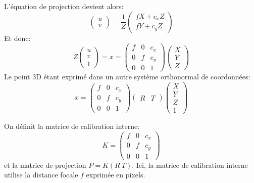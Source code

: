 \documentclass[info, math]{mpb-cours}
\begin{document}
L'équation de projection devient alors:
\begin{equation*}
	\begin{pmatrix}
		u \\ v
	\end{pmatrix} = \frac{1}{Z}
	\begin{pmatrix}
		fX + c_{x}Z \\ fY + c_{y}Z
	\end{pmatrix}
\end{equation*}
Et donc:
\begin{equation*}
	Z \begin{pmatrix}
		u \\ v \\ 1
	\end{pmatrix} = x =
	\begin{pmatrix}
		f & 0 & c_{x} \\ 0 & f & c_{y}\\ 0 & 0 & 1
	\end{pmatrix}
	\begin{pmatrix}
		X \\ Y \\ Z
	\end{pmatrix}
\end{equation*}
Le point 3D étant exprimé dans un autre système orthonormal de coordonnées:
\begin{equation*}
	x =	\begin{pmatrix}
		f & 0 & c_{x} \\ 0 & f & c_{y}\\ 0 & 0 & 1
	\end{pmatrix}
	\begin{pmatrix}
		R & T
	\end{pmatrix}
	\begin{pmatrix}
		X \\ Y \\ Z\\ 1
	\end{pmatrix}
\end{equation*}

On définit la matrice de calibration interne:
\begin{equation*}
	K = \begin{pmatrix}
		f & 0 & c_{x} \\ 0 & f & c_{y}\\ 0 & 0 & 1
	\end{pmatrix}
\end{equation*}
et la matrice de projection $P = K \left(R \ T\right)$.
Ici, la matrice de calibration interne utilise la distance focale $f$ exprimée en pixels.
\end{document}
